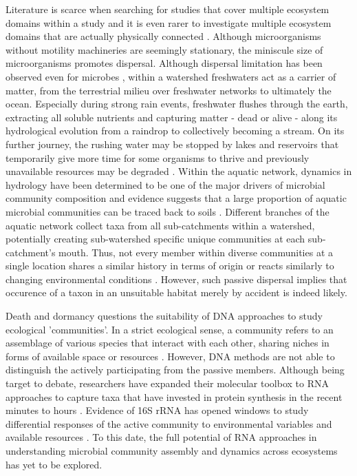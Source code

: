 \documentclass[12pt,a4paper]{article} %
\begin{document}
Literature is scarce when searching for studies that cover multiple ecosystem domains within a study \citep{Nemergut2011, Shade2013} and it is even rarer to investigate multiple ecosystem domains that are actually physically connected \citep{Ruiz-Gonzalez2015, Hauptmann2016, Doherty2017}. Although microorganisms without motility machineries are seemingly stationary, the miniscule size of microorganisms promotes dispersal. Although dispersal limitation has been observed even for microbes \citep{Hanson2012}, within a watershed freshwaters act as a carrier of matter, from the terrestrial milieu over freshwater networks to ultimately the ocean. Especially during strong rain events, freshwater flushes through the earth, extracting all soluble nutrients and capturing matter - dead or alive - along its hydrological evolution from a raindrop to collectively becoming a stream. On its further journey, the rushing water may be stopped by lakes and reservoirs that temporarily give more time for some organisms to thrive and previously unavailable resources may be degraded \citep{Catalan2016a}. Within the aquatic network, dynamics in hydrology have been determined to be one of the major drivers of microbial community composition \citep{Nino-Garcia2016} and evidence suggests that a large proportion of aquatic microbial communities can be traced back to soils \citep{Crump2012, Besemer2013, Ruiz-Gonzalez2015, Hauptmann2016}. Different branches of the aquatic network collect taxa from all sub-catchments within a watershed, potentially creating sub-watershed specific unique communities at each sub-catchment's mouth. Thus, not every member within diverse communities at a single location shares a similar history in terms of origin \citep{Nino-Garcia2016, Comte2017} or reacts similarly to changing environmental conditions \citep{Fierer2007}. However, such passive dispersal implies that occurence of a taxon in an unsuitable habitat merely by accident is indeed likely.

Death and dormancy \citep{Cole1999, Jones2010} questions the suitability of DNA approaches to study ecological 'communities'. In a strict ecological sense, a community refers to an assemblage of various species that interact with each other, sharing niches in forms of available space or resources \citep{Konopka2009}. However, DNA methods are not able to distinguish the actively participating from the passive members. Although being target to debate, researchers have expanded their molecular toolbox to RNA approaches to capture taxa that have invested in protein synthesis in the recent minutes to hours \citep{Blazewicz2013}. Evidence of 16S rRNA has opened windows to study differential responses of the active community to environmental variables and available resources \citep{Osterholz2016}. To this date, the full potential of RNA approaches in understanding microbial community assembly and dynamics across ecosystems has yet to be explored.
\end{document}
